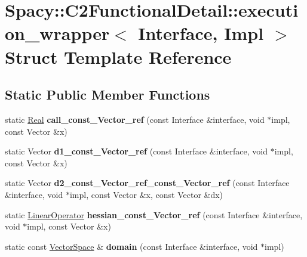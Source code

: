 \hypertarget{structSpacy_1_1C2FunctionalDetail_1_1execution__wrapper}{\section{\-Spacy\-:\-:\-C2\-Functional\-Detail\-:\-:execution\-\_\-wrapper$<$ \-Interface, \-Impl $>$ \-Struct \-Template \-Reference}
\label{structSpacy_1_1C2FunctionalDetail_1_1execution__wrapper}
}
\subsection*{\-Static \-Public \-Member \-Functions}
\begin{DoxyCompactItemize}
\item 
\hypertarget{structSpacy_1_1C2FunctionalDetail_1_1execution__wrapper_ad5e45a894db67bfb361fc8aa970fcb2d}{static \hyperlink{classSpacy_1_1Real}{\-Real} {\bfseries call\-\_\-const\-\_\-\-Vector\-\_\-ref} (const \-Interface \&interface, void $\ast$impl, const \-Vector \&x)}\label{structSpacy_1_1C2FunctionalDetail_1_1execution__wrapper_ad5e45a894db67bfb361fc8aa970fcb2d}

\item 
\hypertarget{structSpacy_1_1C2FunctionalDetail_1_1execution__wrapper_ad91c2b1fab1c75b438e7a66fee8dc1f1}{static \-Vector {\bfseries d1\-\_\-const\-\_\-\-Vector\-\_\-ref} (const \-Interface \&interface, void $\ast$impl, const \-Vector \&x)}\label{structSpacy_1_1C2FunctionalDetail_1_1execution__wrapper_ad91c2b1fab1c75b438e7a66fee8dc1f1}

\item 
\hypertarget{structSpacy_1_1C2FunctionalDetail_1_1execution__wrapper_aa278f271029d3ae06e2324a1a2e24a18}{static \-Vector {\bfseries d2\-\_\-const\-\_\-\-Vector\-\_\-ref\-\_\-const\-\_\-\-Vector\-\_\-ref} (const \-Interface \&interface, void $\ast$impl, const \-Vector \&x, const \-Vector \&dx)}\label{structSpacy_1_1C2FunctionalDetail_1_1execution__wrapper_aa278f271029d3ae06e2324a1a2e24a18}

\item 
\hypertarget{structSpacy_1_1C2FunctionalDetail_1_1execution__wrapper_a95d6f15df3fba9b7b9be97dd0e482057}{static \hyperlink{classSpacy_1_1LinearOperator}{\-Linear\-Operator} {\bfseries hessian\-\_\-const\-\_\-\-Vector\-\_\-ref} (const \-Interface \&interface, void $\ast$impl, const \-Vector \&x)}\label{structSpacy_1_1C2FunctionalDetail_1_1execution__wrapper_a95d6f15df3fba9b7b9be97dd0e482057}

\item 
\hypertarget{structSpacy_1_1C2FunctionalDetail_1_1execution__wrapper_a60276bcdfa9d2f02cf0ffcd899a58f41}{static const \hyperlink{classSpacy_1_1VectorSpace}{\-Vector\-Space} \& {\bfseries domain} (const \-Interface \&interface, void $\ast$impl)}\label{structSpacy_1_1C2FunctionalDetail_1_1execution__wrapper_a60276bcdfa9d2f02cf0ffcd899a58f41}

\end{DoxyCompactItemize}
